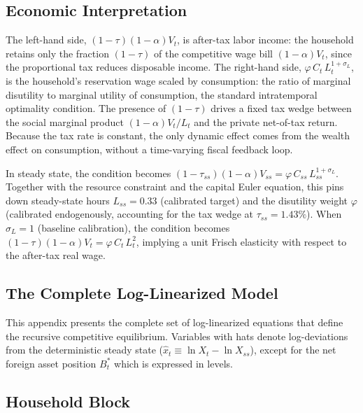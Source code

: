 	\subsection*{Economic Interpretation}
	
	The left-hand side, $(1-\tau)(1-\alpha)V_t$, is after-tax labor income: the household retains only the fraction $(1-\tau)$ of the competitive wage bill $(1-\alpha)V_t$, since the proportional tax reduces disposable income. The right-hand side, $\varphi\,C_t\,L_t^{1+\sigma_L}$, is the household's reservation wage scaled by consumption: the ratio of marginal disutility to marginal utility of consumption, the standard intratemporal optimality condition. The presence of $(1-\tau)$ drives a fixed tax wedge between the social marginal product $(1-\alpha)V_t/L_t$ and the private net-of-tax return. Because the tax rate is constant, the only dynamic effect comes from the wealth effect on consumption, without a time-varying fiscal feedback loop.
	
	In steady state, the condition becomes $(1-\tau_{ss})(1-\alpha)V_{ss} = \varphi\,C_{ss}\,L_{ss}^{1+\sigma_L}$. Together with the resource constraint and the capital Euler equation, this pins down steady-state hours $L_{ss} = 0.33$ (calibrated target) and the disutility weight $\varphi$ (calibrated endogenously, accounting for the tax wedge at $\tau_{ss} = 1.43\%$). When $\sigma_L = 1$ (baseline calibration), the condition becomes $(1-\tau)(1-\alpha)V_t = \varphi\,C_t\,L_t^2$, implying a unit Frisch elasticity with respect to the after-tax real wage.


\subsection{The Complete Log-Linearized Model} \label{app:log_lin}

This appendix presents the complete set of log-linearized equations that define the recursive competitive equilibrium. Variables with hats denote log-deviations from the deterministic steady state ($\hat{x}_t \equiv \ln X_t - \ln X_{ss}$), except for the net foreign asset position $B^*_t$ which is expressed in levels.

\subsection{Household Block}
	
